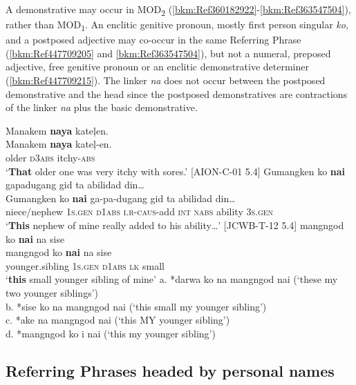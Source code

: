 \largerpage
A demonstrative may occur in MOD\textsubscript{2} (\ref{bkm:Ref360182922}-\ref{bkm:Ref363547504}), rather than MOD\textsubscript{1}. An enclitic genitive pronoun, mostly first person singular \textit{ko}, and a postposed adjective may co-occur in the same Referring Phrase (\ref{bkm:Ref447709205} and \ref{bkm:Ref363547504}), but not a numeral, preposed adjective, free genitive pronoun or an enclitic demonstrative determiner (\ref{bkm:Ref447709215}). The linker \textit{na} does not occur between the postposed demonstrative and the head since the postposed demonstratives are contractions of the linker \textit{na} plus the basic demonstrative.

\ea
\label{bkm:Ref360182922}
Manakem  \textbf{naya}  kateļen. \\\smallskip
 \gll Manakem  \textbf{naya}  kateļ-en. \\
older  \textsc{d3abs}  itchy-\textsc{abs} \\
\glt ‘\textbf{That} older one was very itchy with sores.’ [AION-C-01 5.4]
\z
\ea
\label{bkm:Ref447709205}
Gumangken  ko  \textbf{nai}  gapadugang  gid  ta  abilidad  din… \\\smallskip
 \gll Gumangken  ko  \textbf{nai}  ga-pa-dugang  gid  ta  abilidad  din… \\
niece/nephew  1\textsc{s.gen}  \textsc{d1abs}  \textsc{i.r}-\textsc{caus}-add  \textsc{int}  \textsc{nabs}  ability  3\textsc{s.gen} \\
\glt `\textbf{This} nephew of mine really added to his ability…’ [JCWB-T-12 5.4]
\z
\ea
\label{bkm:Ref363547504}
mangngod  ko  \textbf{nai}  na  sise \\\smallskip
 \gll mangngod  ko  \textbf{nai}  na  sise \\
younger.sibling  1\textsc{s.gen}  \textsc{d1abs}  \textsc{lk}  small \\
\glt ‘\textbf{this} small younger sibling of mine’
\z
\ea
\label{bkm:Ref447709215}
a.  *darwa ko na mangngod nai       (‘these my two younger siblings’) \\
b.  *sise ko na mangngod nai        (‘this small my younger sibling’) \\
c.  *ake na mangngod nai        (‘this MY younger sibling’) \\
d.  *mangngod ko i nai        (‘this my younger sibling’)
\z

\subsection{Referring Phrases headed by personal names}
\label{sec:referringphrasesheadedbypersonalnames}

